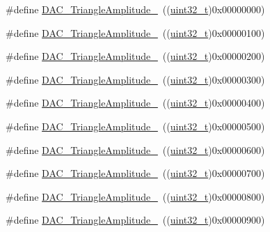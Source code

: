 \begin{DoxyCompactItemize}
\item 
\#define \hyperlink{group___d_a_c__lfsrunmask__triangleamplitude_ga49b1eddf4e6371b4be8751162dc94ac4}{D\+A\+C\+\_\+\+Triangle\+Amplitude\+\_}~((\hyperlink{_p_e___types_8h_a33594304e786b158f3fb30289278f5af}{uint32\+\_\+t})0x00000000)
\item 
\#define \hyperlink{group___d_a_c__lfsrunmask__triangleamplitude_ga9798d68c3bbf0a57306bf2f962697377}{D\+A\+C\+\_\+\+Triangle\+Amplitude\+\_}~((\hyperlink{_p_e___types_8h_a33594304e786b158f3fb30289278f5af}{uint32\+\_\+t})0x00000100)
\item 
\#define \hyperlink{group___d_a_c__lfsrunmask__triangleamplitude_gad3f31de1277836df1109576a53c47e87}{D\+A\+C\+\_\+\+Triangle\+Amplitude\+\_}~((\hyperlink{_p_e___types_8h_a33594304e786b158f3fb30289278f5af}{uint32\+\_\+t})0x00000200)
\item 
\#define \hyperlink{group___d_a_c__lfsrunmask__triangleamplitude_ga42653712ce783d33ecb2f3e97e9c2ece}{D\+A\+C\+\_\+\+Triangle\+Amplitude\+\_}~((\hyperlink{_p_e___types_8h_a33594304e786b158f3fb30289278f5af}{uint32\+\_\+t})0x00000300)
\item 
\#define \hyperlink{group___d_a_c__lfsrunmask__triangleamplitude_ga10b15745b749c62a56bd3d7bd5a27e1b}{D\+A\+C\+\_\+\+Triangle\+Amplitude\+\_}~((\hyperlink{_p_e___types_8h_a33594304e786b158f3fb30289278f5af}{uint32\+\_\+t})0x00000400)
\item 
\#define \hyperlink{group___d_a_c__lfsrunmask__triangleamplitude_gaaae92dae9c4da55e29c645396825e36b}{D\+A\+C\+\_\+\+Triangle\+Amplitude\+\_}~((\hyperlink{_p_e___types_8h_a33594304e786b158f3fb30289278f5af}{uint32\+\_\+t})0x00000500)
\item 
\#define \hyperlink{group___d_a_c__lfsrunmask__triangleamplitude_gaacec0af3f69db46f8984be3af9ecadfb}{D\+A\+C\+\_\+\+Triangle\+Amplitude\+\_}~((\hyperlink{_p_e___types_8h_a33594304e786b158f3fb30289278f5af}{uint32\+\_\+t})0x00000600)
\item 
\#define \hyperlink{group___d_a_c__lfsrunmask__triangleamplitude_gadb404422c86a7b92d78e6d9617e8ce4d}{D\+A\+C\+\_\+\+Triangle\+Amplitude\+\_}~((\hyperlink{_p_e___types_8h_a33594304e786b158f3fb30289278f5af}{uint32\+\_\+t})0x00000700)
\item 
\#define \hyperlink{group___d_a_c__lfsrunmask__triangleamplitude_ga565b0c97bbdf152756617d491bf8ef85}{D\+A\+C\+\_\+\+Triangle\+Amplitude\+\_}~((\hyperlink{_p_e___types_8h_a33594304e786b158f3fb30289278f5af}{uint32\+\_\+t})0x00000800)
\item 
\#define \hyperlink{group___d_a_c__lfsrunmask__triangleamplitude_ga7d573b0cebb1b939bd83367effb93d89}{D\+A\+C\+\_\+\+Triangle\+Amplitude\+\_}~((\hyperlink{_p_e___types_8h_a33594304e786b158f3fb30289278f5af}{uint32\+\_\+t})0x00000900)

\end{DoxyCompactItemize}
